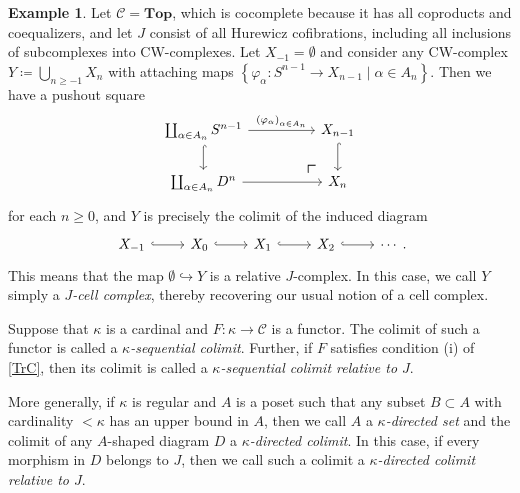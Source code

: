 \documentclass[10pt,letterpaper,cm]{nupset}
\theoremstyle{definition}
\newtheorem{exmp}[definition]{Example}
\theoremstyle{theorem}
\theoremstyle{remark}
\newcommand{\0}{\mathbf{0}}
\newcommand{\1}{\mathbf{1}}
\newcommand{\2}{\mathbf{2}}
\renewcommand{\c}{\mathscr{C}}
\begin{document}
\begin{exmp}
Let $\c = \mathbf{Top}$, which is cocomplete because it has all coproducts and coequalizers, and let $J$ consist of all Hurewicz cofibrations, including all inclusions of subcomplexes into CW-complexes.  Let $X_{{-1}} = \emptyset$ and consider any CW-complex $Y\coloneqq \bigcup_{n\geq {-1}}X_n$ with attaching maps $\left\{\varphi_{\alpha} : S^{n-1} \to X_{n-1} \mid \alpha \in A_n\right\}$. Then we have a pushout square
\[
\begin{tikzcd}[column sep=huge]
\coprod_{\alpha \in A_n}S^{n-1} \arrow[d, hook]
 \arrow[dr, phantom, "\scalebox{1.5}{\color{black}$\ulcorner$}", very near end, color=black]
  \arrow[r, "\left(\varphi_{\alpha}\right)_{\alpha \in A_n}"] & X_{n-1} \arrow[d, hook] \\
\coprod_{\alpha \in A_n}D^n \arrow[r]                                                                         & X_n                    
\end{tikzcd}
\] for each $n\geq 0$, and $Y$ is precisely the colimit of the induced diagram
\[
\begin{tikzcd}
X_{{-1}} \arrow[r, hook] & X_0 \arrow[r, hook] & X_1 \arrow[r, hook] & X_2 \arrow[r, hook] & \cdots
\end{tikzcd}.
\] This means that the map $\emptyset \hookrightarrow Y$ is a relative $J$-complex. In this case, we call $Y$ simply a \textit{$J$-cell complex}, thereby recovering our usual notion of a cell complex. 
\end{exmp}

\smallskip

Suppose that $\kappa$ is a cardinal and $F: \kappa \to \c$ is a functor. The colimit of such a functor is called a \textit{$\kappa$-sequential colimit}. Further, if $F$ satisfies condition (i) of \cref{TrC}, then its colimit is called a \textit{$\kappa$-sequential colimit relative to $J$}.

\medskip

More generally, if $\kappa$ is regular and $A$ is a poset such that any subset $B \subset A$ with cardinality $< \kappa$ has an upper bound in $A$, then we call $A$ a \textit{$\kappa$-directed set} and the colimit of any $A$-shaped diagram $D$ a \textit{$\kappa$-directed colimit}. In this case, if every morphism in $D$ belongs to $J$, then we call such a colimit a \textit{$\kappa$-directed colimit relative to $J$}.
\end{document}
